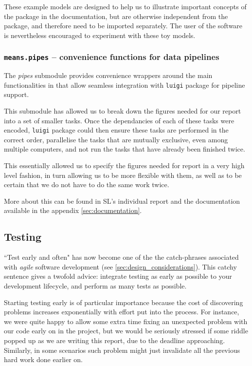 These example models are designed to help us to illustrate important concepts of the package in the documentation, but are otherwise independent from the package, and therefore need to be imported separately.
The user of the software is nevertheless encouraged to experiment with these toy models.

\subsubsection{{\tt means.pipes} -- convenience functions for data pipelines}
The \emph{pipes} submodule provides convenience wrappers around the main functionalities in \means{} that allow seamless integration with \verb"luigi" package for pipeline support\cite{_luigi_????}.

This submodule has allowed us to break down the figures needed for our report into a set of smaller tasks. 
Once the dependancies of each of these tasks were encoded, \verb"luigi" package could then ensure these tasks are performed in the correct order, parallelise the tasks that are mutually exclusive, even among multiple computers, and not run the tasks that have already been finished twice.

This essentially allowed us to specify the figures needed for report in a very high level fashion, in turn allowing us to be more flexible with them, as well as to be certain that we do not have to do the same work twice.

More about this can be found in SL's individual report and the documentation available in the appendix \autoref{sec:documentation}.

\subsection{Testing}
\label{sec:testing}

``Test early and often" has now become one of the the catch-phrases associated with \emph{agile} software development (see \autoref{sec:design_considerations}). 
This catchy sentence gives a twofold advice: integrate testing as early as possible to your development lifecycle, and perform as many tests as possible.

Starting testing early is of particular importance because the cost of discovering problems increases exponentially with effort put into the process.  
For instance, we were quite happy to allow some extra time fixing an unexpected problem with our code early on in the project, but we would be seriously stressed if some riddle popped up as we are writing this report, due to the deadline approaching. 
Similarly, in some scenarios such problem might just invalidate all the previous hard work done earlier on.

